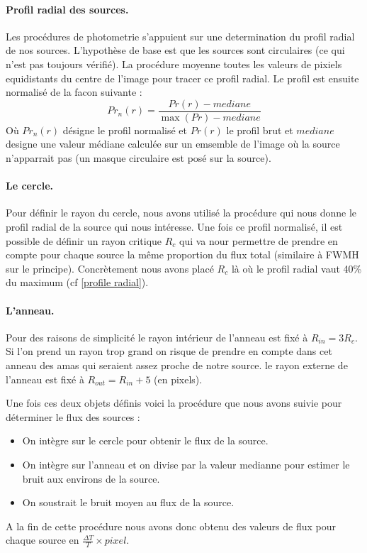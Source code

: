\documentclass[a4paper,11pt]{article}
\begin{document}
\paragraph{Profil radial des sources.} Les procédures de photometrie s'appuient sur une determination 
du profil radial de nos sources. L'hypothèse de base est que les sources sont circulaires (ce qui n'est 
pas toujours vérifié). La procédure moyenne toutes les valeurs de pixiels equidistants du centre de l'image
pour tracer ce profil radial. Le profil est ensuite normalisé de la facon suivante  : 
\begin{equation}
Pr_n(r) = \frac{Pr(r) - mediane}{\max ( Pr) - mediane}
\end{equation} 
Où $Pr_n(r)$ désigne le profil normalisé et $Pr(r)$ le profil brut et $mediane$ designe une valeur médiane
calculée sur un emsemble de l'image où la source n'apparrait pas (un masque circulaire est posé sur la source).\\

\paragraph{Le cercle.} Pour définir le rayon du cercle, nous avons utilisé la procédure qui nous donne le
profil radial de la source qui nous intéresse. Une fois ce profil normalisé, il est possible de définir un rayon critique
$R_c$ qui va nour permettre de prendre en compte pour chaque source la même proportion du flux total
(similaire à FWMH sur le principe). Concrètement nous avons placé $R_c$ là où le profil radial vaut 40\% du maximum
(cf \ref{profile radial}). \\ 

\paragraph{L'anneau.} Pour des raisons de simplicité le rayon intérieur de l'anneau 
est fixé à $R_{in} = 3R_c $. Si l'on prend un rayon trop grand on risque de prendre en compte dans cet
anneau des amas qui seraient assez proche de notre source.  le rayon externe de l'anneau est fixé à 
$R_{out} = R_{in} + 5  $ (en pixels).

Une fois ces deux objets définis voici la procédure que nous avons suivie pour déterminer le
flux des sources : 
\begin{itemize}
\item On intègre sur le cercle pour obtenir le flux de la source.
\item On intègre sur l'anneau et on divise par la valeur medianne pour estimer le bruit 
aux environs de la source.
\item On soustrait le bruit moyen  au flux de la source.
\end{itemize}
A la fin de cette procédure nous avons donc obtenu des valeurs de flux pour chaque source en 
$\frac{\Delta T}{T}\times pixel $.
\end{document}
